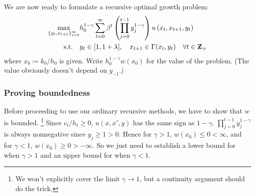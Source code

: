 \documentclass[11pt,letterpaper,reqno,oneside]{article}
\begin{document}
We are now ready to formulate a recursive optimal growth problem:
%
\begin{align*}
	\max_{ \{ y_t, x_{t+1} \}_{t=0}^\infty }
	&h_0^{1-\gamma} 
	\sum_{t=0}^\infty \beta^t
	\left( \prod_{j=0}^{t-1} y_j^{1-\gamma} \right) 
	u\left( x_t, x_{t+1}, y_t \right)
	\\
	\text{s.t.}\quad
	&y_t \in [1,1+\lambda], \quad x_{t+1} \in \Gamma(x_t,y_t)
	\quad\forall t \in \mathbf{Z}_+ 
\end{align*}
%
where $x_0 \coloneqq k_0 / h_0$ is given. Write $h_0^{1-\gamma} w(x_0)$ for the value of the problem. (The value obviously doesn't depend on $y_{-1}$.)



\subsubsection{Proving boundedness}
\label{sec:04Nov2015:human_capital_accumulation_model:boundedness}

Before proceeding to use our ordinary recursive methods, we have to show that $w$ is bounded.%
	\footnote{We won't explicitly cover the limit $\gamma \to 1$, but a continuity argument should do the trick.}
Since $c_t/h_t \geq 0$, $u(x,x',y)$ has the same sign as $1-\gamma$. $\prod_{j=0}^{t-1} y_j^{1-\gamma}$ is always nonnegative since $y_j \geq 1 > 0$. Hence for $\gamma>1$, $w(x_0) \leq 0 < \infty$, and for $\gamma<1$, $w(x_0) \geq 0 > -\infty$. So we just need to establish a lower bound for when $\gamma>1$ and an upper bound for when $\gamma<1$.
\end{document}
